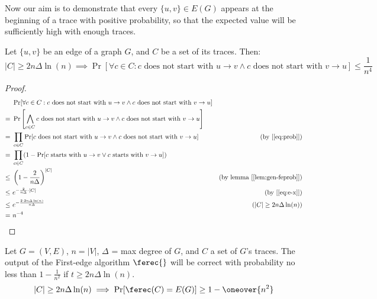 Now our aim is to demonstrate that every $\{u, v\} \in E(G)$ appears at the beginning of a trace with positive probability, so that the expected value will be sufficiently high with enough traces.

\begin{lem}\label{lem:fesetprob}
    Let $\{u, v\}$ be an edge of a graph $G$, and $C$ be a set of its traces. Then:
    \[
        |C| \geq 2n \Delta \ln(n) \implies \Pr[\forall c \in C : c \text{ does not start with } u \to v \wedge c \text{ does not start with } v \to u] \leq \frac{1}{n^4}
    \]
\end{lem}

\begin{proof}
    \begin{align*}
            &\ \Pr[\forall c \in C : c \text{ does not start with } u \to v \wedge c \text{ does not start with } v \to u]  & \\
           =&\ \Pr \left[ \bigwedge_{c \in C} c \text{ does not start with } u \to v \wedge c \text{ does not start with } v \to u \right] &  \\
           =&\ \prod_{c \in C} \Pr[c \text{ does not start with } u \to v \wedge c \text{ does not start with } v \to u]    & \text{(by [\ref{eq:prob}])} \\
           =&\ \prod_{c \in C} (1 - \Pr[c \text{ starts with } u \to v \vee c \text{ starts with } v \to u])                & \\
        \leq&\ \left( 1 - \frac{2}{n \Delta} \right)^{|C|}                                                                  & \text{(by lemma [\ref{lem:gen-feprob}])}\\
        \leq&\ e^{-\frac{2}{n \Delta} \cdot |C|}                                                                            & \text{(by [\ref{eq:e-x}])} \\
        \leq&\ e^{-\frac{2 \cdot 2 n \Delta \ln(n)}{n \Delta}}                                                              & (|C| \geq 2n \Delta \ln(n)) \\
           =&\ n^{-4}                                                                                                       & \\
    \end{align*}
\end{proof}

\begin{thm}\label{thm:first-edge}
    Let $G = (V, E)$, $n = |V|$, $\Delta$ = max degree of $G$, and $C$ a set of $G$'s traces. The output of the First-edge algorithm $\ferec{}$ will be correct with probability no less than $1 - \frac{1}{n^2}$ if $t \geq 2 n \Delta \ln(n)$.
    \[
        |C| \geq 2n \Delta \ln(n) \implies \Pr[\ferec(C) = E(G)] \geq 1 - \oneover{n^2}
    \]
\end{thm}

